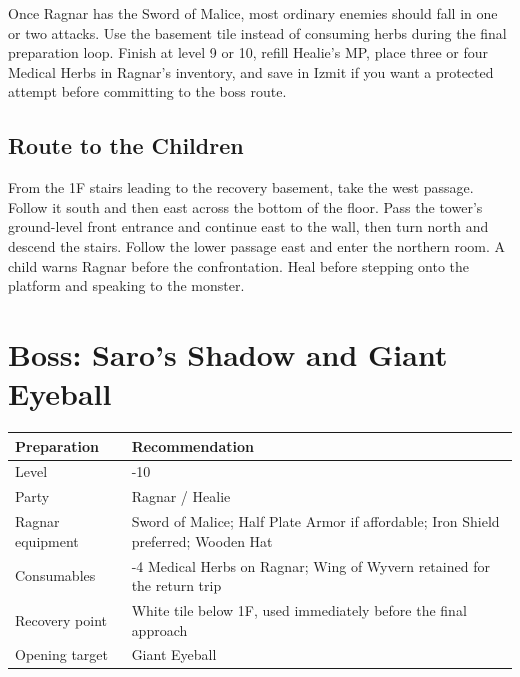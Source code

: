 \documentclass[
  american,
  10pt,
  letterpaper,
  oneside,
  open=any]{scrreprt}
\newcounter{none} %
\newenvironment{guidetable}{%
  \small\setstretch{1.0}%
  \setlength{\tabcolsep}{4pt}%
  \setlength{\LTpre}{8pt}\setlength{\LTpost}{10pt}%
  \renewcommand{\arraystretch}{1.16}%
}{ }
\begin{document}
Once Ragnar has the Sword of Malice, most ordinary enemies should fall
in one or two attacks. Use the basement tile instead of consuming herbs
during the final preparation loop. Finish at level 9 or 10, refill
Healie's MP, place three or four Medical Herbs in Ragnar's inventory,
and save in Izmit if you want a protected attempt before committing to
the boss route.

\subsection{Route to the Children}\label{route-to-the-children}

From the 1F stairs leading to the recovery basement, take the west
passage. Follow it south and then east across the bottom of the floor.
Pass the tower's ground-level front entrance and continue east to the
wall, then turn north and descend the stairs. Follow the lower passage
east and enter the northern room. A child warns Ragnar before the
confrontation. Heal before stepping onto the platform and speaking to
the monster.

\section{Boss: Saro's Shadow and Giant
Eyeball}\label{boss-saros-shadow-and-giant-eyeball}

\begin{guidetable}

{\def\LTcaptype{none} %
\begin{longtable}[]{@{}
  >{\raggedright\arraybackslash}p{}
  >{\raggedright\arraybackslash}p{}@{}}
\toprule\noalign{}
\begin{minipage}[b]{\linewidth}\raggedright
\color{GuideGreen}\bfseries Preparation
\end{minipage} & \begin{minipage}[b]{\linewidth}\raggedright
\color{GuideGreen}\bfseries Recommendation
\end{minipage} \\
\midrule\noalign{}
\endhead
\bottomrule\noalign{}
\endlastfoot
Level & 9-10 \\
Party & Ragnar / Healie \\
Ragnar equipment & Sword of Malice; Half Plate Armor if affordable; Iron
Shield preferred; Wooden Hat \\
Consumables & 3-4 Medical Herbs on Ragnar; Wing of Wyvern retained for
the return trip \\
Recovery point & White tile below 1F, used immediately before the final
approach \\
Opening target & Giant Eyeball \\
\end{longtable}
}

\end{guidetable}
\end{document}
